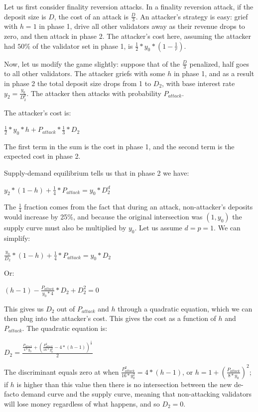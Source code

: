 \documentclass[12pt]{article}
\begin{document}
Let us first consider finality reversion attacks. In a finality reversion attack, if the deposit size is $D$, the cost of an attack is $\frac{D}{3}$. An attacker's strategy is easy: grief with $h = 1$ in phase 1, drive all other validators away as their revenue drops to zero, and then attack in phase 2. The attacker's cost here, assuming the attacker had $50\%$ of the validator set in phase 1, is $\frac{1}{2} * y_0 * (1 - \frac{1}{r})$.

Now, let us modify the game slightly: suppose that of the $\frac{D}{3}$ penalized, half goes to all other validators. The attacker griefs with some $h$ in phase 1, and as a result in phase 2 the total deposit size drops from 1 to $D_2$, with base interest rate $y_2 = \frac{y_0}{D_2^p}$. The attacker then attacks with probability $P_{attack}$.

The attacker's cost is:

$\frac{1}{2} * y_0 * h + P_{attack} * \frac{1}{3} * D_2$

The first term in the sum is the cost in phase 1, and the second term is the expected cost in phase 2.

Supply-demand equilibrium tells us that in phase 2 we have:

$y_2 * (1-h) + \frac{1}{4} * P_{attack} = y_0 * D_2^d$

The $\frac{1}{4}$ fraction comes from the fact that during an attack, non-attacker's deposits would increase by 25\%, and because the original intersection was $(1, y_0)$ the supply curve must also be multiplied by $y_0$. Let us assume $d = p = 1$. We can simplify:

$\frac{y_0}{D_2} * (1-h) + \frac{1}{4} * P_{attack} = y_0 * D_2$

Or:

$(h-1) - \frac{P_{attack}}{y_0 * 4} * D_2 + D_2^2 = 0$

This gives us $D_2$ out of $P_{attack}$ and $h$ through a quadratic equation, which we can then plug into the attacker's cost. This gives the cost as a function of $h$ and $P_{attack}$. The quadratic equation is:

$D_2 = \frac{\frac{P_{attack}}{4 * y_0} + (\frac{P_{attack}^2}{16 * y_0^2} - 4 * (h-1))^{\frac{1}{2}}}{2}$

The discriminant equals zero at when $\frac{P_{attack}^2}{16 * y_0^2} = 4 * (h-1)$, or $h = 1 + (\frac{P_{attack}}{8 * y_0})^2$; if $h$ is higher than this value then there is no intersection between the new de-facto demand curve and the supply curve, meaning that non-attacking validators will lose money regardless of what happens, and so $D_2 = 0$.
\end{document}

